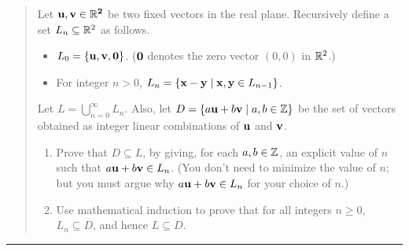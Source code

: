 \documentclass[11pt]{article}
\begin{document}
\begin{quote}
\newcommand{\bu}{\bf u}
\newcommand{\bv}{\bf v}
\item Let $\bu,\bv \in \R^2$ be two fixed vectors in the real plane.
Recursively define a set $L_n \subseteq \R^2$
as follows.
\begin{itemize}
\item $L_0 = \{\bu,\bv,{\bf 0}\}$. (${\bf 0}$ denotes the zero vector 
$(0,0)$ in $\R^2$.)
\item For integer $n > 0$, $L_n = \{ {\bf x}- {\bf y} \mid {\bf x}, {\bf y}
  \in L_{n-1} \}$.
\end{itemize}
Let $L = \bigcup_{n=0}^\infty L_n$. Also, let $D = \{ a{\bf u}+b{\bf
  v} \mid a,b \in \Z \}$ be the set of vectors obtained as integer
linear combinations of ${\bf u}$ and ${\bf v}$.
\begin{enumerate}
\item Prove that $D \subseteq L$, by giving, for each $a,b\in\Z$,
an explicit value of $n$ such that $a{\bf u}+b{\bf v}\in L_n$. 
(You don't need to
minimize the value of $n$; but you must argue why $a{\bf u}+b{\bf v} \in L_n$ for your
choice of $n$.)
\item Use mathematical induction to prove that for all integers $n\ge 0$,
$L_n \subseteq D$, and hence $L \subseteq D$.
\end{enumerate}
\end{quote}
\hrule
\end{document}
